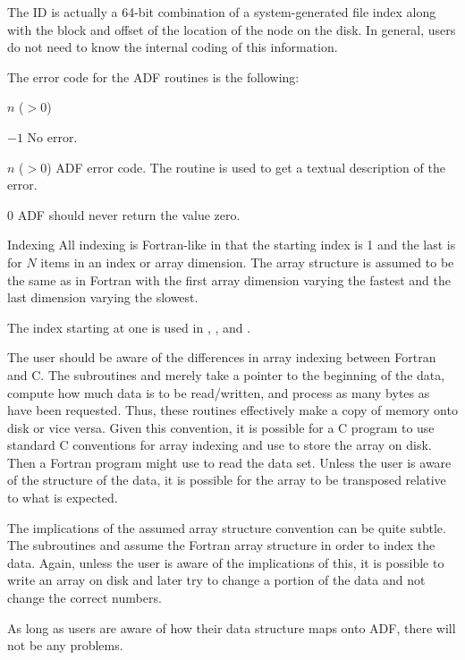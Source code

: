 \begin{Ventryi}{}
      The ID is actually a 64-bit combination of a system-generated
      file index along with the block and offset of the location of the
      node on the disk.
      In general, users do not need to know the internal coding of this
      information.
\item [\fort{error\_return}]
      The error code for the ADF routines is the following:
      \begin{Ventryi}{$n$ ($> 0$)}
      \item [$-1$]
            No error.
      \item [$n$ ($> 0$)]
            ADF error code.
            The routine
            \hyperlink{sub:Error_Message}{}
            is used to get a textual description of the error.
      \item [0]
            ADF should never return the value zero.
      \end{Ventryi}
\item [Indexing]
      All indexing is Fortran-like in that the starting index is 1 and
      the last is  for $N$ items in an index or array
      dimension.
      The array structure is assumed to be the same as in Fortran
      with the first array dimension varying the fastest and the last
      dimension varying the slowest.
 
      The index starting at one is used in
      \hyperlink{sub:Read_Data}{},
      \hyperlink{sub:Write_Data}{}, and
      \hyperlink{sub:Children_Names}{}.
 
      The user should be aware of the differences in array indexing
      between Fortran and C.
      The subroutines
      \hyperlink{sub:Read_All_Data}{} and
      \hyperlink{sub:Write_All_Data}{}
      merely take a pointer to the beginning of the data, compute how
      much data is to be read/written, and process as many bytes as
      have been requested.
      Thus, these routines effectively make a copy of memory onto disk
      or vice versa.
      Given this convention, it is possible for a C program to
      use standard C conventions for array indexing and use
       to store the array on disk.
      Then a Fortran program might use  to
      read the data set.
      Unless the user is aware of the structure of the data, it is
      possible for the array to be transposed relative to what is
      expected.
 
      The implications of the assumed array structure convention can be
      quite subtle.
      The subroutines  and
       assume the Fortran array structure in
      order to index the data.
      Again, unless the user is aware of the implications of this, it
      is possible to write an array on disk and later try to change a
      portion of the data and not change the correct numbers.
 
      As long as users are aware of how their data structure maps onto
      ADF, there will not be any problems.
\end{Ventryi}
